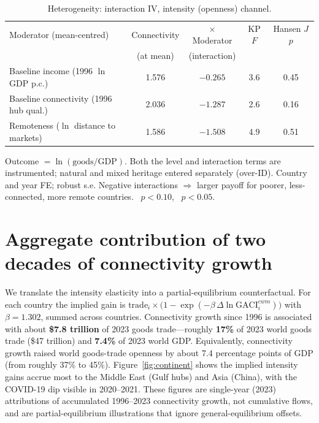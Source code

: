 \documentclass[review,3p,times]{elsarticle}
\newcommand{\sym}[1]{\rlap{$^{#1}$}}
\begin{document}
\begin{table}[t]
\centering
\caption{Heterogeneity: interaction IV, intensity (openness) channel.}
\label{tab:het}
\begin{threeparttable}
\small
\begin{tabular}{lcccc}
\toprule
Moderator (mean-centred) & Connectivity & $\times$ Moderator & KP $F$ & Hansen $J$ $p$ \\
                         & (at mean)    & (interaction)      &        &  \\
\midrule
Baseline income (1996 $\ln$ GDP p.c.)   & 1.576\sym{**} & $-0.265$\sym{**} & 3.6 & 0.45 \\
Baseline connectivity (1996 hub qual.)  & 2.036\sym{*}  & $-1.287$\sym{**} & 2.6 & 0.16 \\
Remoteness ($\ln$ distance to markets)  & 1.586\sym{**} & $-1.508$\sym{**} & 4.9 & 0.51 \\
\bottomrule
\end{tabular}
\begin{tablenotes}\footnotesize
\item Outcome $=\ln(\text{goods}/\text{GDP})$. Both the level and interaction
terms are instrumented; natural and mixed heritage entered separately (over-ID).
Country and year FE; robust s.e. Negative interactions $\Rightarrow$ larger
payoff for poorer, less-connected, more remote countries.
\sym{*}~$p<0.10$, \sym{**}~$p<0.05$.
\end{tablenotes}
\end{threeparttable}
\end{table}

\section{Aggregate contribution of two decades of connectivity growth}
We translate the intensity elasticity into a partial-equilibrium
counterfactual. For each country the implied gain is
$\text{trade}_{i}\times\bigl(1-\exp(-\beta\,\Delta\ln\text{GACI}^{cwm}_{i})\bigr)$
with $\beta=1.302$, summed across countries. Connectivity growth since 1996 is
associated with about \textbf{\$7.8 trillion} of 2023 goods trade---roughly
\textbf{17\%} of 2023 world goods trade (\$47 trillion) and \textbf{7.4\%} of
2023 world GDP. Equivalently, connectivity growth raised world goods-trade
openness by about 7.4 percentage points of GDP (from roughly 37\% to 45\%).
Figure~\ref{fig:continent} shows the implied intensity gains accrue most to the
Middle East (Gulf hubs) and Asia (China), with the COVID-19 dip visible in
2020--2021. These figures are single-year (2023) attributions of accumulated
1996--2023 connectivity growth, not cumulative flows, and are
partial-equilibrium illustrations that ignore general-equilibrium offsets.
\end{document}
